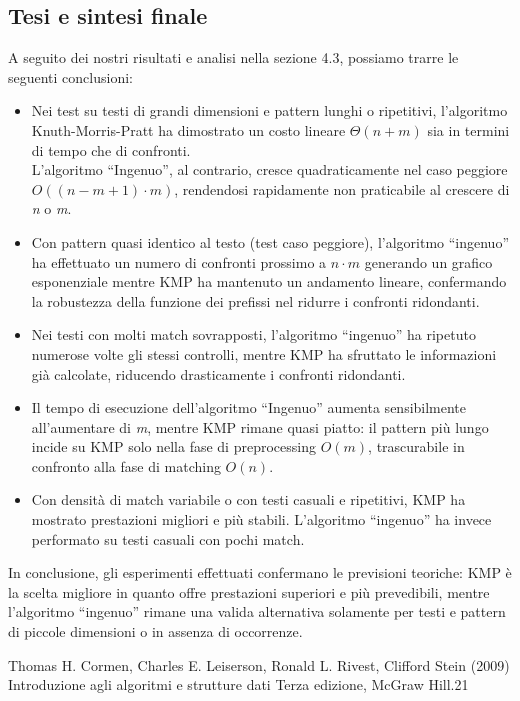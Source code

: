\documentclass{article}
\begin{document}
\subsection{Tesi e sintesi finale}
A seguito dei nostri risultati e analisi nella sezione 4.3, possiamo trarre le seguenti conclusioni:
\begin{itemize}
    \item Nei test su testi di grandi dimensioni e pattern lunghi o ripetitivi, l'algoritmo Knuth-Morris-Pratt ha dimostrato un costo lineare $\Theta(n + m)$ sia in termini di tempo che di confronti.\\
    L'algoritmo ``Ingenuo'', al contrario, cresce quadraticamente nel caso peggiore $O((n - m + 1) \cdot m)$, rendendosi rapidamente non praticabile al crescere di \textit{n} o \textit{m}.
    \item Con pattern quasi identico al testo (test caso peggiore), l'algoritmo ``ingenuo'' ha effettuato un numero di confronti prossimo a \textit{$n \cdot m$} generando un grafico esponenziale mentre KMP ha mantenuto un andamento lineare, confermando la robustezza della funzione dei prefissi nel ridurre i confronti ridondanti.
    \item Nei testi con molti match sovrapposti, l'algoritmo ``ingenuo'' ha ripetuto numerose volte gli stessi controlli, mentre KMP ha sfruttato le informazioni già calcolate, riducendo drasticamente i confronti ridondanti.
    \item Il tempo di esecuzione dell'algoritmo ``Ingenuo'' aumenta sensibilmente all'aumentare di \textit{m}, mentre KMP rimane quasi piatto: il pattern più lungo incide su KMP solo nella fase di preprocessing $O(m)$, trascurabile in confronto alla fase di matching $O(n)$.
    \item Con densità di match variabile o con testi casuali e ripetitivi, KMP ha mostrato prestazioni migliori e più stabili. L'algoritmo ``ingenuo'' ha invece performato su testi casuali con pochi match.
\end{itemize}
In conclusione, gli esperimenti effettuati confermano le previsioni teoriche: KMP è la scelta migliore in quanto offre prestazioni superiori e più prevedibili, mentre l'algoritmo ``ingenuo'' rimane una valida alternativa solamente per testi e pattern di piccole dimensioni o in assenza di occorrenze.

\newpage
{}
\begin{thebibliography}{9}
Thomas H. Cormen, Charles E. Leiserson, Ronald L. Rivest, Clifford Stein (2009) Introduzione agli algoritmi e strutture dati Terza edizione, McGraw Hill.21
\end{thebibliography}
\end{document}

